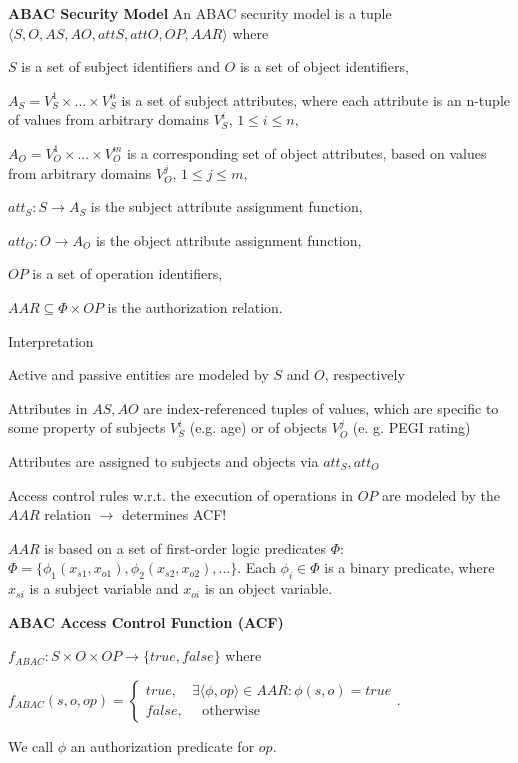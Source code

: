 \documentclass[a4paper]{article}
\renewcommand{\note}[2]{\begin{noteBox} \textbf{#1} #2 \end{noteBox}}
\begin{document}
\begin{multicols}{3}
    \note{ABAC Security Model}{An ABAC security model is a tuple $\langle S,O,AS,AO,attS,attO,OP,AAR\rangle$ where
        \begin{itemize*}
            \item $S$ is a set of subject identifiers and $O$ is a set of object identifiers,
            \item $A_S=V_S^1 \times...\times V_S^n$ is a set of subject attributes, where each attribute is an n-tuple of values from arbitrary domains $V_S^i$, $1\leq i \leq n$,
            \item $A_O=V_O^1\times...\times V_O^m$ is a corresponding set of object attributes, based on values from arbitrary domains $V_O^j$, $1\leq j \leq m$,
            \item $att_S:S\rightarrow A_S$ is the subject attribute assignment function,
            \item $att_O:O\rightarrow A_O$ is the object attribute assignment function,
            \item $OP$ is a set of operation identifiers,
            \item $AAR\subseteq \Phi\times OP$ is the authorization relation.
        \end{itemize*}
    }

    Interpretation
    \begin{itemize*}
        \item Active and passive entities are modeled by $S$ and $O$, respectively
        \item Attributes in $AS,AO$ are index-referenced tuples of values, which are specific to some property of subjects $V_S^i$ (e.g. age) or of objects $V_O^j$ (e. g. PEGI rating)
        \item Attributes are assigned to subjects and objects via $att_S,att_O$
        \item Access control rules w.r.t. the execution of operations in $OP$ are modeled by the $AAR$ relation $\rightarrow$ determines ACF!
        \item $AAR$ is based on a set of first-order logic predicates $\Phi$: $\Phi=\{\phi_1 (x_{s1},x_{o1}),\phi_2 (x_{s2},x_{o2}),...\}$. Each $\phi_i\in\Phi$ is a binary predicate, where $x_{si}$ is a subject variable and $x_{oi}$ is an object variable.
    \end{itemize*}

    \note{ABAC Access Control Function (ACF)}{
        \begin{itemize*}
            \item $f_{ABAC}:S\times O\times OP\rightarrow\{true,false\}$ where
            \item $f_{ABAC}(s,o,op)= \begin{cases} true, \quad\exists \langle \phi,op\rangle \in AAR:\phi(s,o)=true\\ false, \quad\text{ otherwise } \end{cases}$.
            \item We call $\phi$ an authorization predicate for $op$.
        \end{itemize*}
    }


\end{multicols}
\end{document}
